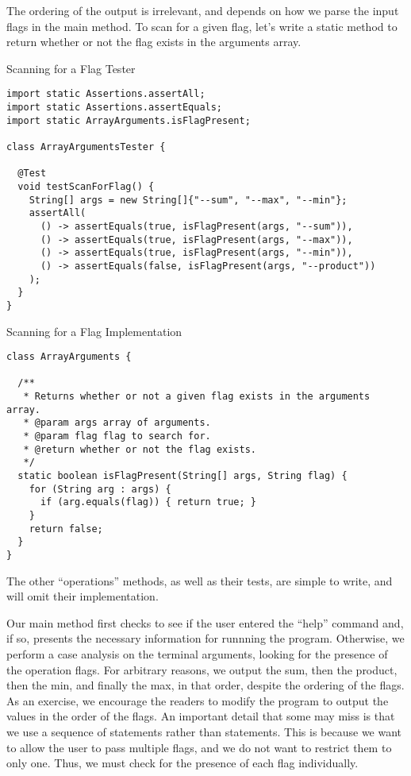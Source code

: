 The ordering of the output is irrelevant, and depends on how we parse the input flags in the main method. To scan for a given flag, let's write a static method to return whether or not the flag exists in the arguments array.

\begin{cl}{Scanning for a Flag Tester} 
\begin{lstlisting}[language=MyJava]
import static Assertions.assertAll;
import static Assertions.assertEquals;
import static ArrayArguments.isFlagPresent;

class ArrayArgumentsTester {

  @Test
  void testScanForFlag() {
    String[] args = new String[]{"--sum", "--max", "--min"};
    assertAll(
      () -> assertEquals(true, isFlagPresent(args, "--sum")),
      () -> assertEquals(true, isFlagPresent(args, "--max")),
      () -> assertEquals(true, isFlagPresent(args, "--min")),
      () -> assertEquals(false, isFlagPresent(args, "--product"))
    );
  }
}
\end{lstlisting}
\end{cl}

\begin{cl}{Scanning for a Flag Implementation}
\begin{lstlisting}[language=MyJava]
class ArrayArguments {

  /**
   * Returns whether or not a given flag exists in the arguments array.
   * @param args array of arguments.
   * @param flag flag to search for.
   * @return whether or not the flag exists.
   */
  static boolean isFlagPresent(String[] args, String flag) {
    for (String arg : args) {
      if (arg.equals(flag)) { return true; }
    }
    return false;
  }
}
\end{lstlisting}
\end{cl}

The other ``operations'' methods, as well as their tests, are simple to write, and will omit their implementation. 

Our main method first checks to see if the user entered the ``help'' command and, if so, presents the necessary information for runnning the program. Otherwise, we perform a case analysis on the terminal arguments, looking for the presence of the operation flags. For arbitrary reasons, we output the sum, then the product, then the min, and finally the max, in that order, despite the ordering of the flags. As an exercise, we encourage the readers to modify the program to output the values in the order of the flags. An important detail that some may miss is that we use a sequence of  statements rather than  statements. This is because we want to allow the user to pass multiple flags, and we do not want to restrict them to only one. Thus, we must check for the presence of each flag individually.

